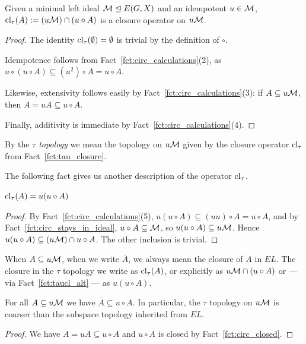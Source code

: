 	\begin{fct}
		\label{fct:tau_closure}
		Given a minimal left ideal ${\mathcal M}\trianglelefteq E(G,X)$ and an idempotent $u\in {\mathcal M}$, $\operatorname{{cl}}_\tau(A):=(u{\mathcal M})\cap (u\circ A)$ is a closure operator on $u{\mathcal M}$.
	\end{fct}
	\begin{proof}
		The identity $\operatorname{{cl}}_{\tau}(\emptyset)=\emptyset$ is trivial by the definition of $\circ$.
		
		Idempotence follows from Fact~\ref{fct:circ_calculations}(2), as $u\circ(u\circ A)\subseteq (u^2)\circ A=u\circ A$.
		
		Likewise, extensivity follows easily by Fact~\ref{fct:circ_calculations}(3): if $A\subseteq u{\mathcal M}$, then $A=uA\subseteq u\circ A$.
		
		Finally, additivity is immediate by Fact~\ref{fct:circ_calculations}(4).
	\end{proof}
	
	\begin{dfn}
		\label{dfn:tau_topology}
		\index{topology!t@$\tau$}
		By the \emph{$\tau$ topology} we mean the topology on $u{\mathcal M}$ given by the closure operator $\operatorname{{cl}}_\tau$ from Fact~\ref{fct:tau_closure}.
		\xqed{\lozenge}
	\end{dfn}
	The following fact gives us another description of the operator $\operatorname{{cl}}_\tau$.
	\begin{fct}
		\label{fct:taucl_alt}
		$\operatorname{{cl}}_\tau(A)=u(u\circ A)$
	\end{fct}
	\begin{proof}
		By Fact~\ref{fct:circ_calculations}(5), $u(u\circ A)\subseteq (uu)\circ A=u\circ A$, and by Fact~\ref{fct:circ_stays_in_ideal}, $u\circ A\subseteq {\mathcal M}$, so $u(u\circ A)\subseteq u{\mathcal M}$. Hence $u(u\circ A)\subseteq (u{\mathcal M})\cap u\circ A$. The other inclusion is trivial.
	\end{proof}
	
	When $A\subseteq u{\mathcal M}$, when we write $\overline{A}$, we always mean the closure of $A$ in $EL$. The closure in the $\tau$ topology we write as $\operatorname{{cl}}_\tau(A)$, or explicitly as $u{\mathcal M}\cap(u\circ A)$ or ---  via Fact~\ref{fct:taucl_alt} --- as $u(u\circ A)$.
	
	\begin{fct}
		\label{fct:tau_coarser}
		For all $A\subseteq u{\mathcal M}$ we have $\overline A\subseteq u\circ A$. In particular, the $\tau$ topology on $u{\mathcal M}$ is coarser than the subspace topology inherited from $EL$.
	\end{fct}
	\begin{proof}
		We have $A=uA\subseteq u\circ A$ and $u\circ A$ is closed by Fact~\ref{fct:circ_closed}.
	\end{proof}
	

